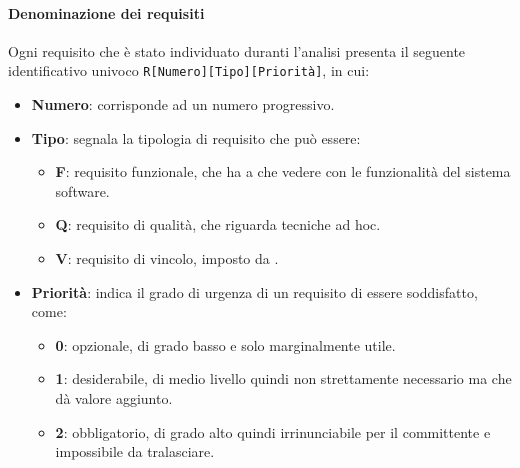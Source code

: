 		\paragraph{Denominazione dei requisiti}\label{PP:Sviluppo:AdR:DenominazioneRequisiti}
		Ogni requisito che è stato individuato duranti l'analisi presenta il seguente identificativo univoco \texttt{R[Numero][Tipo][Priorità]}, in cui:
		\begin{itemize}
		 	\item \textbf{Numero}: corrisponde ad un numero progressivo.
		 	\item \textbf{Tipo}: segnala la tipologia di requisito che può essere:
		 	\begin{itemize}
		 		\item \textbf{F}: requisito funzionale, che ha a che vedere con le funzionalità del sistema software.
		 		\item \textbf{Q}: requisito di qualità, che riguarda tecniche ad hoc.
		 		\item \textbf{V}: requisito di vincolo, imposto da \II.
		 	\end{itemize}
	 		\item \textbf{Priorità}: indica il grado di urgenza di un requisito di essere soddisfatto, come:
	 		\begin{itemize}
	 			\item \textbf{0}: opzionale, di grado basso e solo marginalmente utile.
	 			\item \textbf{1}: desiderabile, di medio livello quindi non strettamente necessario ma che dà valore aggiunto.
	 			\item \textbf{2}: obbligatorio, di grado alto quindi irrinunciabile per il committente e impossibile da tralasciare.
	 		\end{itemize}
		\end{itemize}

